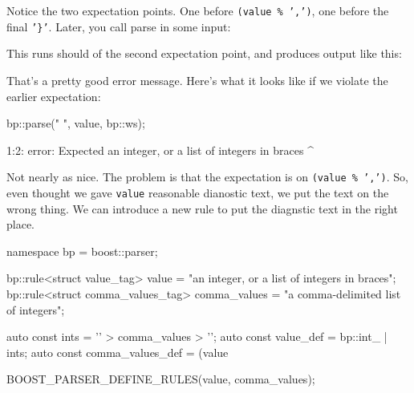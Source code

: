 
Notice the two expectation points. One before \texttt{(value \% ',')}, one before the final \texttt{'\}'}. Later, you call parse in some input:

\begin{code}
bp::parse("{ 4, 5 a", value, bp::ws);
\end{code}

This runs should of the second expectation point, and produces output like this:

\begin{code}
1:7: error: Expected '}' here:
{ 4, 5 a
       ^
\end{code}

That's a pretty good error message. Here's what it looks like if we violate the earlier expectation:

\begin{code}
bp::parse("{ }", value, bp::ws);
\end{code}

\begin{code}
1:2: error: Expected an integer, or a list of integers in braces %
{ }
  ^
\end{code}

Not nearly as nice. The problem is that the expectation is on \texttt{(value \% ',')}. So, even thought we gave \texttt{value} reasonable dianostic text, we put the text on the wrong thing. We can introduce a new rule to put the diagnstic text in the right place.

\begin{code}
namespace bp = boost::parser;

bp::rule<struct value_tag> value =
    "an integer, or a list of integers in braces";
bp::rule<struct comma_values_tag> comma_values =
    "a comma-delimited list of integers";

auto const ints = '{' > comma_values > '}';
auto const value_def = bp::int_ | ints;
auto const comma_values_def = (value %

BOOST_PARSER_DEFINE_RULES(value, comma_values);
\end{code}

